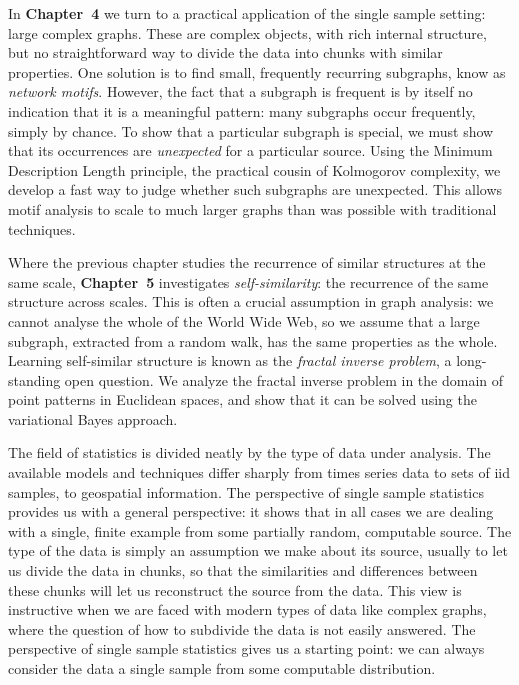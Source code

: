 \documentclass{scrartcl}
\begin{document}
In \textbf{Chapter~4} we turn to a practical application of the single sample setting: large complex graphs. These are complex objects, with rich internal structure, but no straightforward way to divide the data into chunks with similar properties. One solution is to find small, frequently recurring subgraphs, know as \emph{network motifs}. However, the fact that a subgraph is frequent is by itself no indication that it is a meaningful pattern: many subgraphs occur frequently, simply by chance. To show that a particular subgraph is special, we must show that its occurrences are \emph{unexpected} for a particular source. Using the Minimum Description Length principle, the practical cousin of Kolmogorov complexity, we develop a fast way to judge whether such subgraphs are unexpected. This allows motif analysis to scale to much larger graphs than was possible with traditional techniques.

Where the previous chapter studies the recurrence of similar structures at the same scale, \textbf{Chapter~5} investigates \emph{self-similarity}: the recurrence of the same structure across scales. This is often a crucial assumption in graph analysis: we cannot analyse the whole of the World Wide Web, so we assume that a large subgraph, extracted from a random walk, has the same properties as the whole. Learning self-similar structure is known as the \emph{fractal inverse problem}, a long-standing open question. We analyze the fractal inverse problem in the domain of point patterns in Euclidean spaces, and show that it can be solved using the variational Bayes approach. 

The field of statistics is divided neatly by the type of data under analysis. The available models and techniques differ sharply from times series data to sets of iid samples, to geospatial information. The perspective of single sample statistics provides us with a general perspective: it shows that in all cases we are dealing with a single, finite example from some partially random, computable source. The type of the data is simply an assumption we make about its source, usually to let us divide the data in chunks, so that the similarities and differences between these chunks will let us reconstruct the source from the data. This view is instructive when we are faced with modern types of data like complex graphs, where the question of how to subdivide the data is not easily answered. The perspective of single sample statistics gives us a starting point: we can always consider the data a single sample from some computable distribution.
\end{document}
